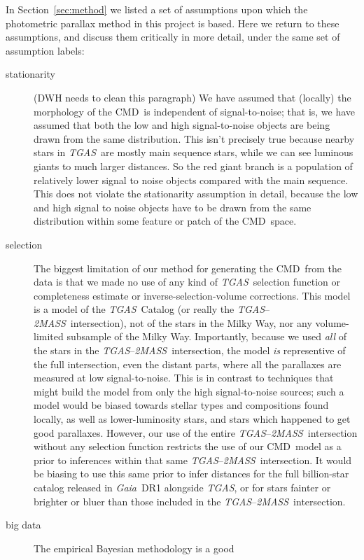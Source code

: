 \documentclass[modern]{aastex61}
\newcommand{\acronym}[1]{{\small{#1}}}
\newcommand{\project}[1]{\textsl{#1}}
\newcommand{\tgas}{\project{\acronym{TGAS}}}
\newcommand{\tmass}{\project{\acronym{2MASS}}}
\newcommand{\gaia}{\project{Gaia}}
\newcommand{\cmd}{\acronym{CMD}}
\begin{document}
In Section~\ref{sec:method} we listed a set of assumptions upon which
the photometric parallax method in this project is based.
Here we return to these assumptions, and discuss them critically in more
detail, under the same set of assumption labels:
\begin{description}
\item[stationarity] (DWH needs to clean this paragraph)
  We have assumed that (locally) the morphology of
  the \cmd\ is independent of signal-to-noise; that is, we have assumed that
  both the low and high
  signal-to-noise objects are being drawn from the same distribution.
  This isn't precisely true because nearby stars in \tgas\ are
  mostly main sequence stars, while we can see luminous giants to much larger
  distances. So the red giant branch is a population of
  relatively lower signal to noise objects compared with the main
  sequence. This does not violate the stationarity assumption in
  detail, because the low and high signal to noise objects have to be
  drawn from the same distribution within some feature or patch of the
  \cmd\ space.
\item[selection] The biggest limitation of our method for generating
  the \cmd\ from the data is that we made no use of any kind of
  \tgas\ selection function or completeness estimate or
  inverse-selection-volume corrections.  This model is a model of the
  \tgas\ Catalog (or really the \tgas--\tmass\ intersection), not of
  the stars in the Milky Way, nor any volume-limited subsample of the
  Milky Way.  Importantly, because we used \emph{all} of the stars in
  the \tgas--\tmass\ intersection, the model \emph{is} representive of
  the full intersection, even the distant parts, where all the
  parallaxes are measured at low signal-to-noise.  This is in contrast
  to techniques that might build the model from only the high
  signal-to-noise sources; such a model would be biased towards
  stellar types and compositions found locally, as well as
  lower-luminosity stars, and stars which happened to get good
  parallaxes.  However, our use of the entire
  \tgas--\tmass\ intersection without any selection function restricts
  the use of our \cmd\ model as a prior to inferences within that same
  \tgas--\tmass\ intersection.  It would be biasing to use this same
  prior to infer distances for the full billion-star catalog released
  in \gaia\ DR1 alongside \tgas, or for stars fainter or brighter or
  bluer than those included in the \tgas--\tmass\ intersection.
\item[big data] The empirical Bayesian methodology is a good

\end{description}
\end{document}
